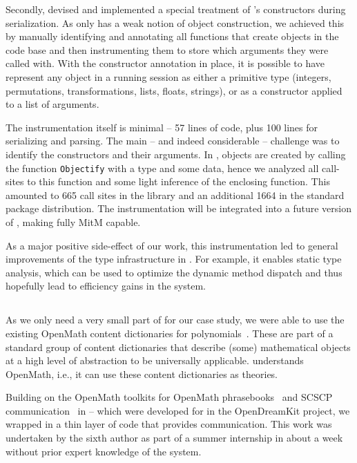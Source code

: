 Secondly, devised and implemented a special treatment of \GAP's constructors during serialization.
As \GAP only has a weak notion of object construction, we achieved this by manually identifying and annotating all functions that create objects in the \GAP code base and then instrumenting them to store which arguments they were called with.
With the constructor annotation in place, it is possible to have \GAP represent any object in a running session as either a primitive type (integers, permutations, transformations, lists, floats, strings), or as a constructor applied to a list of arguments.

The instrumentation itself is minimal -- 57 lines of \GAP code, plus 100 lines for serializing and parsing.
The main -- and indeed considerable -- challenge was to identify the constructors and their arguments.
In \GAP, objects are created by calling the function \lstinline|Objectify| with a type and some data, hence we analyzed
all call-sites to this function and some light inference of the enclosing function.
This amounted to 665 call sites in the \GAP library and an additional 1664 in the standard package distribution.
The instrumentation will be integrated into a future version of \GAP, making \GAP fully MitM capable.

As a major positive side-effect of our work, this instrumentation led to general improvements of the type infrastructure in \GAP.
For example, it enables static type analysis, which can be used to optimize the dynamic method dispatch and thus hopefully lead to efficiency gains in the system.

\subsection{\Singular}

As we only need a very small part of \Singular for our case study, we were able to use the existing OpenMath content dictionaries for polynomials~\cite{OMCD:poly:on}.
These are part of a standard group of content dictionaries that describe (some) mathematical objects at a high level of abstraction to be universally applicable.
\OMMT understands OpenMath, i.e., it can use these content dictionaries as \OMMT theories.

Building on the OpenMath toolkits for OpenMath phrasebooks~\cite{py-openmath:on} and SCSCP communication~\cite{py-scscp:on} in {\Python} -- which were developed for \Sage in the
OpenDreamKit project, we wrapped \Singular in a thin layer of \Python code that provides \SCSCP communication.
This work was undertaken by the sixth author as part of a summer internship in about a week without prior expert knowledge of the system.

